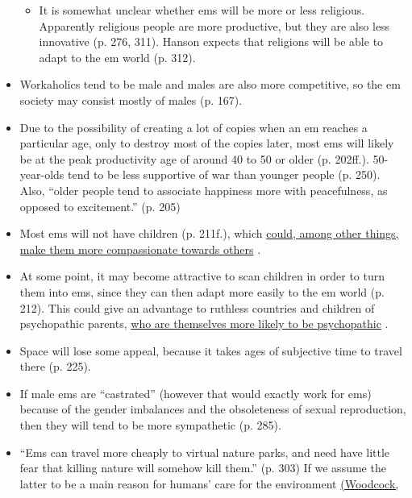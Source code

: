 \documentclass[]{article}
\begin{document}
\begin{itemize}
  \begin{itemize}
  \item
    It is somewhat unclear whether ems will be more or less religious.
    Apparently religious people are more productive, but they are also
    less innovative (p. 276, 311). Hanson expects that religions will be
    able to adapt to the em world (p. 312).
  \end{itemize}
\item
  Workaholics tend to be male and males are also more competitive, so
  the em society may consist mostly of males (p. 167).
\item
  Due to the possibility of creating a lot of copies when an em reaches
  a particular age, only to destroy most of the copies later, most ems
  will likely be at the peak productivity age of around 40 to 50 or
  older (p. 202ff.). 50-year-olds tend to be less supportive of war than
  younger people (p. 250). Also, ``older people tend to associate
  happiness more with peacefulness, as opposed to excitement.'' (p. 205)
\item
  Most ems will not have children (p. 211f.), which
  \href{http://www.theatlantic.com/health/archive/2015/11/having-kids-can-make-parents-less-empathetic/416592/}{could,
  among other things, make them more compassionate towards others}
  \parencite{Gilead2014-rv}.
\item
  At some point, it may become attractive to scan children in order to
  turn them into ems, since they can then adapt more easily to the em
  world (p. 212). This could give an advantage to ruthless countries and
  children of psychopathic parents,
  \href{http://aftermath-surviving-psychopathy.org/index.php/is-psychopathy-genetic/}{who
  are themselves more likely to be psychopathic}
  \parencites[chapter 5]{Viding2010-my}{Waldman2006-ka,Farrington2006-az}.
\item
  Space will lose some appeal, because it takes ages of subjective time
  to travel there (p. 225).
\item
  If male ems are ``castrated'' (however that would exactly work for
  ems) because of the gender imbalances and the obsoleteness of sexual
  reproduction, then they will tend to be more sympathetic (p. 285).
\item
  ``Ems can travel more cheaply to virtual nature parks, and need have
  little fear that killing nature will somehow kill them.'' (p. 303) If
  we assume the latter to be a main reason for humans' care for the
  environment
  \href{http://www.collectionscanada.gc.ca/obj/s4/f2/dsk3/ftp04/NQ59050.pdf\#page=165}{(Woodcock,
}
\end{itemize}
\end{document}
